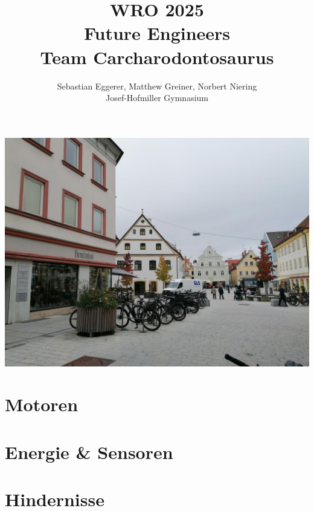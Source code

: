 \documentclass{article}
\title{
    \vspace{-2cm}
    \Huge WRO 2025 \\ Future Engineers \\[0.5cm]
    \LARGE Team Carcharodontosaurus
}
\author{
    \large Sebastian Eggerer, Matthew Greiner, Norbert Niering \\ [0.2cm]
    \large Josef-Hofmiller Gymnasium
}
\date{}
\begin{document}
\maketitle
\begin{center}
  \includegraphics[scale=0.17]{team_photo}
\end{center}


\newpage

\section{Motoren}

\section{Energie \& Sensoren}

\section{Hindernisse}
\end{document}
